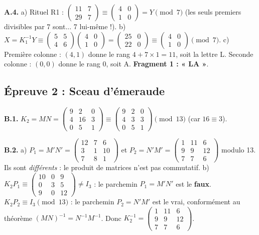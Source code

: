 \documentclass[11pt,a4paper]{article}
\begin{document}
	\textbf{A.4.} a) Rituel R1 :
	$\begin{pmatrix}11&7\\29&7\end{pmatrix}
	\equiv \begin{pmatrix}4&0\\1&0\end{pmatrix} = Y \pmod 7$
	(les seuls premiers divisibles par 7 sont... 7 lui-même !).
	b) $X = K_1^{-1} Y \equiv \begin{pmatrix}5&5\\4&6\end{pmatrix}
	\begin{pmatrix}4&0\\1&0\end{pmatrix}
	= \begin{pmatrix}25&0\\22&0\end{pmatrix}
	\equiv \begin{pmatrix}4&0\\1&0\end{pmatrix} \pmod 7$.
	c) Première colonne : $(4,1)$ donne le rang $4 + 7\times 1 = 11$,
	soit la lettre L. Seconde colonne : $(0,0)$ donne le rang $0$, soit A.
	\textbf{Fragment 1 : « LA »}.
	
	\subsection*{Épreuve 2 : Sceau d'émeraude}
	\textbf{B.1.} $K_2 = MN = \begin{pmatrix}9&2&0\\4&16&3\\0&5&1\end{pmatrix}
	\equiv \begin{pmatrix}9&2&0\\4&3&3\\0&5&1\end{pmatrix} \pmod{13}$
	(car $16 \equiv 3$).
	
	\textbf{B.2.} a) $P_1 = M'N' = \begin{pmatrix}12&7&6\\3&1&10\\7&8&1\end{pmatrix}$
	et $P_2 = N'M' = \begin{pmatrix}1&11&6\\9&9&12\\7&7&6\end{pmatrix}$
	modulo 13. Ils sont \emph{différents} : le produit de matrices n'est pas
	commutatif.
	b) $K_2 P_1 \equiv \begin{pmatrix}10&0&9\\0&3&5\\9&0&12\end{pmatrix}
	\neq I_3$ : le parchemin $P_1 = M'N'$ est le \textbf{faux}.
	$K_2 P_2 \equiv I_3 \pmod{13}$ : le parchemin $P_2 = N'M'$ est le vrai,
	conformément au théorème $(MN)^{-1} = N^{-1}M^{-1}$.
	Donc $K_2^{-1} = \begin{pmatrix}1&11&6\\9&9&12\\7&7&6\end{pmatrix}$.
	
\end{document}

